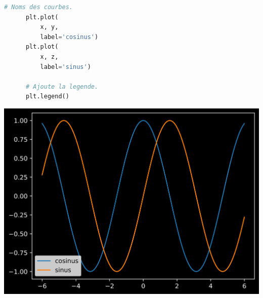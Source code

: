 \documentclass[aspectratio=169]{beamer}
\begin{document}
\begin{frame}[fragile]{}{}
  \vfill
  \begin{minipage}{.48\textwidth}
    \begin{lstlisting}[language=Python]
      # Noms des courbes.
      plt.plot(
          x, y,
          label='cosinus')
      plt.plot(
          x, z,
          label='sinus')

      # Ajoute la legende.
      plt.legend()
    \end{lstlisting}
  \end{minipage}%
  \hfill
  \begin{minipage}{.48\textwidth}
    \centering
    \includegraphics[width=\textwidth]{mline_plot_legend}
  \end{minipage}
  \vfill
\end{frame}
\end{document}

